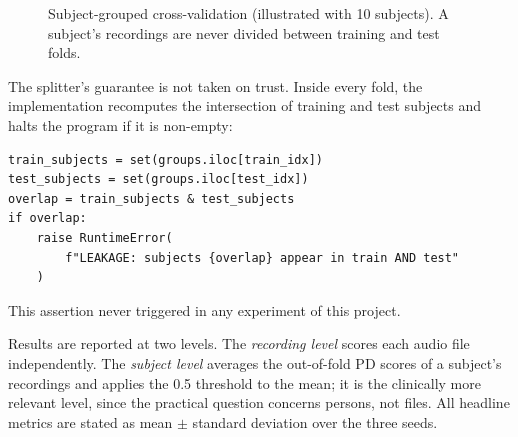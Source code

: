 \begin{figure}[htb]
\centering
{}
\caption{Subject-grouped cross-validation (illustrated with 10
subjects). A subject's recordings are never divided between training
and test folds.}
\label{fig:groupedcv}
\end{figure}

The splitter's guarantee is not taken on trust. Inside every fold, the
implementation recomputes the intersection of training and test
subjects and halts the program if it is non-empty:

\begin{verbatim}
train_subjects = set(groups.iloc[train_idx])
test_subjects = set(groups.iloc[test_idx])
overlap = train_subjects & test_subjects
if overlap:
    raise RuntimeError(
        f"LEAKAGE: subjects {overlap} appear in train AND test"
    )
\end{verbatim}

\noindent
This assertion never triggered in any experiment of this project.

Results are reported at two levels. The \emph{recording level} scores
each audio file independently. The \emph{subject level} averages the
out-of-fold PD scores of a subject's recordings and applies the 0.5
threshold to the mean; it is the clinically more relevant level, since
the practical question concerns persons, not files. All headline
metrics are stated as mean $\pm$ standard deviation over the three
seeds.

